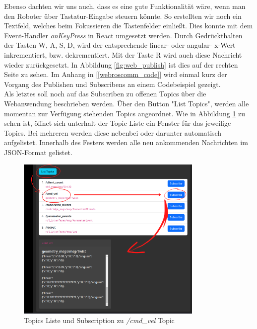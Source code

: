 \begin{flushleft}
Ebenso dachten wir uns auch, dass es eine gute Funktionalität wäre, wenn man den Roboter über Tastatur-Eingabe steuern könnte.
So erstellten wir noch ein Textfeld, welches beim Fokussieren die Tastenfelder einließt.
Dies konnte mit dem Event-Handler \textit{onKeyPress} in React umgesetzt werden.
Durch Gedrückthalten der Tasten W, A, S, D, wird der entsprechende linear- oder angular- x-Wert inkrementiert, bzw. dekrementiert.
Mit der Taste R wird auch diese Nachricht wieder zurückgesetzt.
In Abbildung \ref{fig:web_publish} ist dies auf der rechten Seite zu sehen.
Im Anhang in [\ref{webroscomm_code}] wird einmal kurz der Vorgang des Publishen und Subscribens an einem Codebeispiel gezeigt.
\\

\vspace{0.5cm}
Als letztes soll noch auf das Subscriben zu offenen Topics über die Webanwendung beschrieben werden.
Über den Button "List Topics", werden alle momentan zur Verfügung stehenden Topics angeordnet. 
Wie in Abbildung \ref{fig:web_subscribe} zu sehen ist, öffnet sich unterhalt der Topic-Liste ein Fenster für das jeweilige Topics. 
Bei mehreren werden diese nebenbei oder darunter automatisch aufgelistet. 
Innerhalb des Festers werden alle neu ankommenden Nachrichten im JSON-Format gelistet.

\begin{figure}[h!]
    \centering
    \includegraphics[width=0.8\textwidth]{imgs/web/web_subscribe.png}
    \caption{Topics Liste und Subscription zu \textit{/cmd\_vel} Topic}
    \label{fig:web_subscribe}%
\end{figure}

\end{flushleft}
    